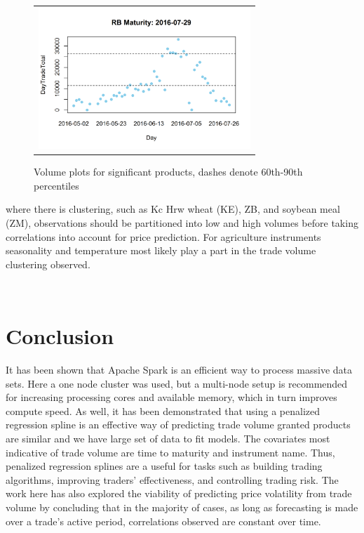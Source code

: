 \documentclass[12pt]{article}
\begin{document}
\begin{figure}[H]
\begin{center}
\begin{tabular}{ll}
			\multicolumn{2}{c}{\includegraphics[width=8cm]{RBtradevolumeTrim.png}}
		\end{tabular}
	\end{center}
	\caption{Volume plots for significant products, dashes denote 60th-90th percentiles}
	\label{fig:18}
\end{figure}

\noindent where there is clustering, such as Kc Hrw wheat (KE), ZB, and soybean meal (ZM), observations should be partitioned into low and high volumes before taking correlations into account for price prediction. For agriculture instruments seasonality and temperature most likely play a part in the trade volume clustering observed.

\
\section*{Conclusion}
It has been shown that Apache Spark is an efficient way to process massive data sets. Here a one node cluster was used, but a multi-node setup is recommended for increasing processing cores and available memory, which in turn improves compute speed. As well, it has been demonstrated that using a penalized regression spline is an effective way of predicting trade volume granted products are similar and we have large set of data to fit models. The covariates most indicative of trade volume are time to maturity and instrument name. Thus, penalized regression splines are a useful for tasks such as building trading algorithms, improving traders' effectiveness, and controlling trading risk. The work here has also explored the viability of predicting price volatility from trade volume by concluding that in the majority of cases, as long as forecasting is made over a trade's active period, correlations observed are constant over time. 
\end{document}
